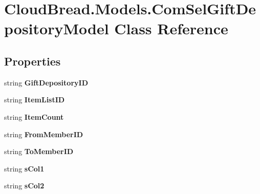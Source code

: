 \hypertarget{a00055}{}\section{Cloud\+Bread.\+Models.\+Com\+Sel\+Gift\+Depository\+Model Class Reference}
\label{a00055}
\subsection*{Properties}
\begin{DoxyCompactItemize}
\item 
string {\bfseries Gift\+Depository\+ID}\hypertarget{a00055_ae16b75d04ca04daf0cfb08eaab88f028}{}\label{a00055_ae16b75d04ca04daf0cfb08eaab88f028}

\item 
string {\bfseries Item\+List\+ID}\hypertarget{a00055_ab896e2c72b71be7d9761263e20d5c6d5}{}\label{a00055_ab896e2c72b71be7d9761263e20d5c6d5}

\item 
string {\bfseries Item\+Count}\hypertarget{a00055_ac963b7f613e4b86bba9276fc83eb5caf}{}\label{a00055_ac963b7f613e4b86bba9276fc83eb5caf}

\item 
string {\bfseries From\+Member\+ID}\hypertarget{a00055_af676ddadd5d6029889a6cad2d32bb7ee}{}\label{a00055_af676ddadd5d6029889a6cad2d32bb7ee}

\item 
string {\bfseries To\+Member\+ID}\hypertarget{a00055_ab7bb14b75df2a9d9341813fa6779fd2f}{}\label{a00055_ab7bb14b75df2a9d9341813fa6779fd2f}

\item 
string {\bfseries s\+Col1}\hypertarget{a00055_a035bc42476203afd668ba5d22ad9f4e4}{}\label{a00055_a035bc42476203afd668ba5d22ad9f4e4}

\item 
string {\bfseries s\+Col2}\hypertarget{a00055_a9712892c6c4e30c2995aeea08c94fc38}{}\label{a00055_a9712892c6c4e30c2995aeea08c94fc38}


\end{DoxyCompactItemize}
